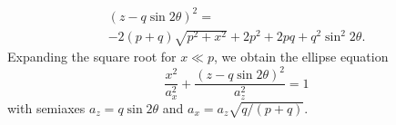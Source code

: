 \documentclass{iucr}       %
\begin{document}
\begin{multline}
\label{eqn:ellipse}
(z - q \sin2\theta)^2 = \\
-2 (p + q) \sqrt{p^2 + x^2}+ 
2 p^2 +2 p q + q^2 \sin^2 2 \theta.
\end{multline}
Expanding the square root for $x\ll p$, we obtain the ellipse equation
\begin{equation}
\label{eqn:ellipse}
\frac{x^2}{a_x^2} + \frac{(z-q \sin2\theta)^2}{a_z^2}=1
\end{equation}
with semiaxes $a_z=q \sin2\theta$ and $a_x=a_z\sqrt{q/(p+q)}$.






% 
% 
% 
% 
\end{document}
